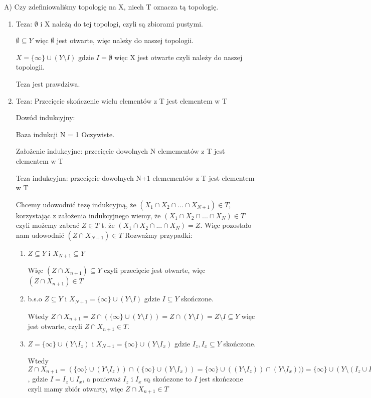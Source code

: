 \documentclass[12pt,a4paper]{article}
\begin{document}
A) Czy zdefiniowaliśmy topologię na X, niech T oznacza tą topologię.
\begin{enumerate}
    \item Teza: $\emptyset$ i X należą do tej topologi, czyli są zbiorami pustymi.
    
    $\emptyset \subseteq Y$ więc $\emptyset$ jest otwarte, więc należy do naszej topologii.
    
    $X = \{\infty\} \cup (Y\setminus I)$ gdzie $I = \emptyset$ więc X jest otwarte czyli należy do naszej topologii.
    
    Teza jest prawdziwa.
    \item Teza: Przecięcie skończenie wielu elementów z T jest elementem w T
    
    Dowód indukcyjny:
    
    Baza indukcji N = 1
        Oczywiste.
    
    Założenie indukcyjne: przecięcie dowolnych N elemementów z T jest elementem w T
    
    Teza indukcyjna: przecięcie dowolnych N+1 elemementów z T jest elementem w T
    
    Chcemy  udowodnić tezę indukcyjną, że $(X_1 \cap X_2 \cap ... \cap X_{N+1}) \in T$, korzystając z założenia indukcyjnego wiemy, że $(X_1 \cap X_2 \cap ... \cap X_{N}) \in T$ czyli możemy zabrać $Z \in T$ t. że $(X_1 \cap X_2 \cap ... \cap X_{N}) = Z$. Więc pozostało nam udowodnić $(Z \cap X_{N+1}) \in T$
    Rozważmy przypadki:
    \begin{enumerate}
        \item $Z \subseteq Y$ i $X_{N+1} \subseteq Y$ 
        
        Więc $(Z\cap X_{n+1}) \subseteq Y$ czyli przecięcie jest otwarte, więc $(Z\cap X_{n+1}) \in T$
        
        \item b.s.o $Z \subseteq Y$ i $X_{N+1} = \{\infty\} \cup (Y\setminus I)$ gdzie $I\subseteq Y$ skończone.
        
        Wtedy $Z\cap X_{n+1}= Z\cap (\{\infty\} \cup (Y\setminus I)) = Z\cap (Y\setminus I) = Z\setminus I \subseteq Y$ więc jest otwarte, czyli $Z\cap X_{n+1} \in T$.
        
        \item $Z =  \{\infty\} \cup (Y\setminus I_z)$ i $X_{N+1} = \{\infty\} \cup (Y\setminus I_x)$ gdzie $I_z, I_x\subseteq Y$ skończone.
        
        Wtedy $Z\cap X_{n+1}= (\{\infty\} \cup (Y\setminus I_z)) \cap (\{\infty\} \cup (Y\setminus I_x)) = \{\infty\} \cup ((Y\setminus I_z)) \cap (Y\setminus I_x))) = \{\infty\} \cup (Y\setminus (I_z \cup I_x)) = \{\infty\} \cup (Y\setminus I)$, gdzie $I = I_z \cup I_x$, a ponieważ $I_z$ i $I_x$ są skończone to $I$ jest skończone czyli mamy zbiór otwarty, więc $Z\cap X_{n+1} \in T$
    \end{enumerate}
    

\end{enumerate}
\end{document}
